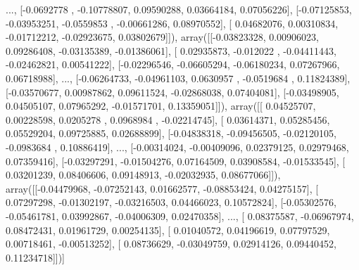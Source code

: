\documentclass{article}
\begin{document}
       ...,
       [-0.0692778 , -0.10778807,  0.09590288,  0.03664184,  0.07056226],
       [-0.07125853, -0.03953251, -0.0559853 , -0.00661286,  0.08970552],
       [ 0.04682076,  0.00310834, -0.01712212, -0.02923675,  0.03802679]]), array([[-0.03823328,  0.00906023,  0.09286408, -0.03135389, -0.01386061],
       [ 0.02935873, -0.012022  , -0.04411443, -0.02462821,  0.00541222],
       [-0.02296546, -0.06605294, -0.06180234,  0.07267966,  0.06718988],
       ...,
       [-0.06264733, -0.04961103,  0.0630957 , -0.0519684 ,  0.11824389],
       [-0.03570677,  0.00987862,  0.09611524, -0.02868038,  0.07404081],
       [-0.03498905,  0.04505107,  0.07965292, -0.01571701,  0.13359051]]), array([[ 0.04525707,  0.00228598,  0.0205278 ,  0.0968984 , -0.02214745],
       [ 0.03614371,  0.05285456,  0.05529204,  0.09725885,  0.02688899],
       [-0.04838318, -0.09456505, -0.02120105, -0.0983684 ,  0.10886419],
       ...,
       [-0.00314024, -0.00409096,  0.02379125,  0.02979468,  0.07359416],
       [-0.03297291, -0.01504276,  0.07164509,  0.03908584, -0.01533545],
       [ 0.03201239,  0.08406606,  0.09148913, -0.02032935,  0.08677066]]), array([[-0.04479968, -0.07252143,  0.01662577, -0.08853424,  0.04275157],
       [ 0.07297298, -0.01302197, -0.03216503,  0.04466023,  0.10572824],
       [-0.05302576, -0.05461781,  0.03992867, -0.04006309,  0.02470358],
       ...,
       [ 0.08375587, -0.06967974,  0.08472431,  0.01961729,  0.00254135],
       [ 0.01040572,  0.04196619,  0.07797529,  0.00718461, -0.00513252],
       [ 0.08736629, -0.03049759,  0.02914126,  0.09440452,  0.11234718]])]
\end{document}
